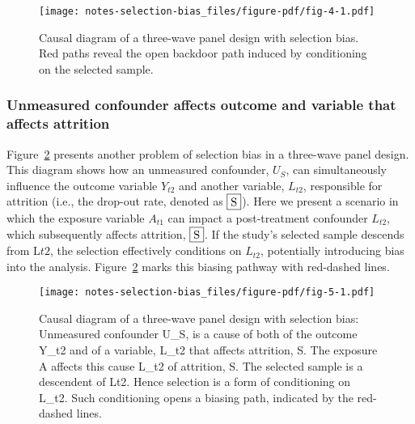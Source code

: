 \documentclass[
  singlecolumn,
  9pt]{article}
\begin{document}
\begin{figure}

{\centering \texttt{[image: notes-selection-bias\_files/figure-pdf/fig-4-1.pdf]}

}

\caption{\label{fig-4}Causal diagram of a three-wave panel design with
selection bias. Red paths reveal the open backdoor path induced by
conditioning on the selected sample.}

\end{figure}

\subsubsection{Unmeasured confounder affects outcome and variable that
affects
attrition}\label{unmeasured-confounder-affects-outcome-and-variable-that-affects-attrition}

Figure~\ref{fig-5} presents another problem of selection bias in a
three-wave panel design. This diagram shows how an unmeasured
confounder, \(U_S\), can simultaneously influence the outcome variable
\(Y_{t2}\) and another variable, \(L_{t2}\), responsible for attrition
(i.e., the drop-out rate, denoted as \(\framebox{S}\)). Here we present
a scenario in which the exposure variable \(A_{t1}\) can impact a
post-treatment confounder \(L_{t2}\), which subsequently affects
attrition, \(\framebox{S}\). If the study's selected sample descends
from L\({t2}\), the selection effectively conditions on \(L_{t2}\),
potentially introducing bias into the analysis. Figure~\ref{fig-5} marks
this biasing pathway with red-dashed lines.

\begin{figure}

{\centering \texttt{[image: notes-selection-bias\_files/figure-pdf/fig-5-1.pdf]}

}

\caption{\label{fig-5}Causal diagram of a three-wave panel design with
selection bias: Unmeasured confounder U\_S, is a cause of both of the
outcome Y\_t2 and of a variable, L\_t2 that affects attrition, S. The
exposure A affects this cause L\_t2 of attrition, S. The selected sample
is a descendent of Lt2. Hence selection is a form of conditioning on
L\_t2. Such conditioning opens a biasing path, indicated by the
red-dashed lines.}

\end{figure}
\end{document}
